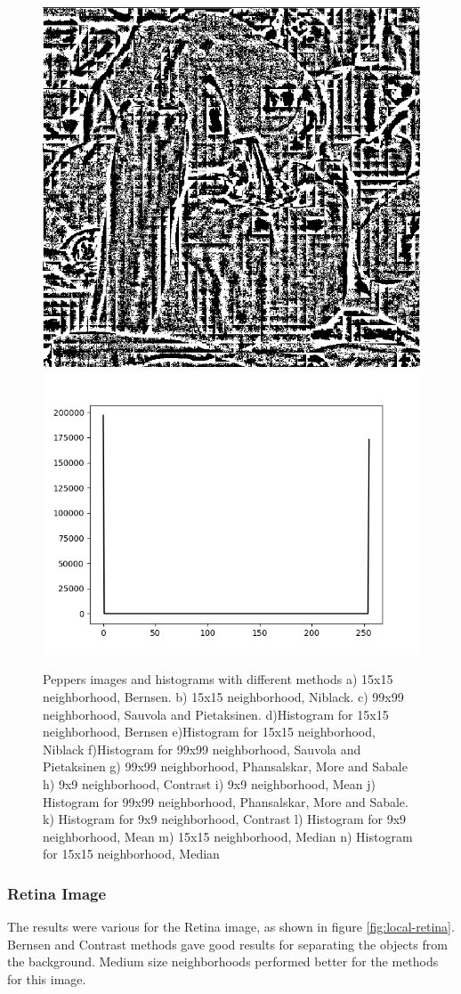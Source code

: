 \documentclass[]{IEEEtran}
\begin{document}
\begin{figure}[h]
  \includegraphics[width=0.3\hsize]{images/15x15-window/peppers_median.png}
  \includegraphics[width=0.3\hsize]{images/15x15-window/peppers_median_histogram.png}

  \caption{Peppers images and histograms with different methods a) 15x15 neighborhood, Bernsen. b) 15x15 neighborhood, Niblack. c) 99x99 neighborhood, Sauvola and Pietaksinen. d)Histogram for 15x15 neighborhood, Bernsen e)Histogram for 15x15 neighborhood, Niblack f)Histogram for 99x99 neighborhood, Sauvola and Pietaksinen g) 99x99 neighborhood, Phansalskar, More and Sabale h) 9x9 neighborhood, Contrast i) 9x9 neighborhood, Mean j) Histogram for 99x99 neighborhood, Phansalskar, More and Sabale. k) Histogram for 9x9 neighborhood, Contrast l) Histogram for 9x9 neighborhood, Mean m) 15x15 neighborhood, Median n) Histogram for 15x15 neighborhood, Median}
  \label{fig:local-peppers}
\end{figure}

\subsubsection{Retina Image}
The results were various for the Retina image, as shown in figure \ref{fig:local-retina}. Bernsen and Contrast methods gave good results for separating the objects from the background. Medium size neighborhoods performed better for the methods for this image.
\end{document}
